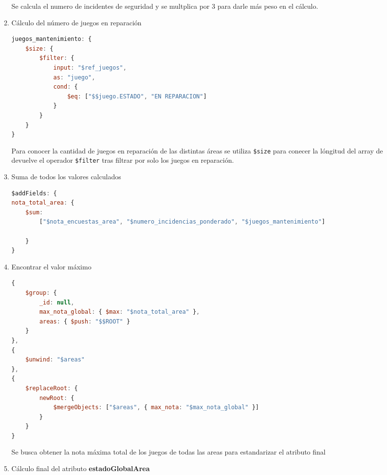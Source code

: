\documentclass[]{article}
\begin{document}
\begin{itemize}
\begin{enumerate}
        Se calcula el numero de incidentes de seguridad y se multplica por 3 para darle más peso en el cálculo.

        \item Cálculo del número de juegos en reparación 
        
        \begin{lstlisting}[caption=Calculo del número de juegos en reparación, language=JavaScript]
juegos_mantenimiento: {
    $size: {
        $filter: {
            input: "$ref_juegos",
            as: "juego",
            cond: {
                $eq: ["$$juego.ESTADO", "EN REPARACION"]
            }
        }
    }
}
        \end{lstlisting}

        Para conocer la cantidad de juegos en reparación de las distintas áreas
        se utiliza \texttt{\$size} para conecer la lóngitud del array de
        devuelve el operador \texttt{\$filter} tras filtrar por solo los juegos en reparación.

        \item Suma de todos los valores calculados
        
        \begin{lstlisting}[language=JavaScript, caption=Calculo de not\_total\_area]
$addFields: {
nota_total_area: {
    $sum: 
        ["$nota_encuestas_area", "$numero_incidencias_ponderado", "$juegos_mantenimiento"]
    
    }
}
        \end{lstlisting}

        \item Encontrar el valor máximo
        
        \begin{lstlisting}[language=JavaScript, caption=Agrupación de áreas previa a la normalización]
{
    $group: {
        _id: null,
        max_nota_global: { $max: "$nota_total_area" },
        areas: { $push: "$$ROOT" }
    }
},
{
    $unwind: "$areas"
},
{
    $replaceRoot: {
        newRoot: {
            $mergeObjects: ["$areas", { max_nota: "$max_nota_global" }]
        }
    }
}
        \end{lstlisting}

        Se busca obtener la nota máxima total de los juegos de todas las areas para estandarizar el atributo final
    
        \item Cálculo final del atributo \textbf{estadoGlobalArea}
        

\end{enumerate}
\end{itemize}
\end{document}
